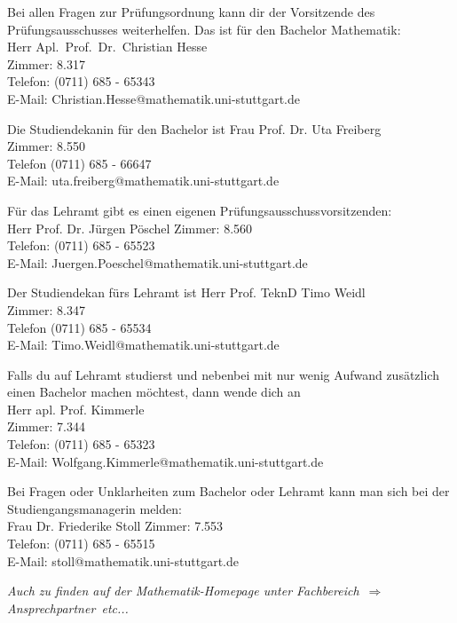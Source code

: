 Bei allen Fragen zur Prüfungsordnung
kann dir der Vorsitzende des Prüfungsausschusses weiterhelfen.
Das ist für den Bachelor Mathematik:\\
Herr Apl.~Prof.~Dr.~Christian Hesse\\
Zimmer: 8.317\\
Telefon: (0711) 685 - 65343\\
E-Mail: Christian.Hesse@mathematik.uni-stuttgart.de

Die Studiendekanin für den  Bachelor ist
Frau Prof. Dr. Uta Freiberg\\
Zimmer: 8.550\\
Telefon (0711) 685 - 66647\\
E-Mail:  uta.freiberg@mathematik.uni-stuttgart.de

\label{LAzust}
Für das Lehramt gibt es einen eigenen Prüfungsausschussvorsitzenden:\\
Herr Prof. Dr. Jürgen Pöschel
Zimmer:  8.560\\
Telefon: (0711) 685 - 65523\\
E-Mail: Juergen.Poeschel@mathematik.uni-stuttgart.de

Der Studiendekan fürs Lehramt ist
Herr Prof. TeknD Timo Weidl\\
Zimmer: 8.347\\
Telefon (0711) 685 - 65534\\
E-Mail: Timo.Weidl@mathematik.uni-stuttgart.de

Falls du auf Lehramt studierst
und nebenbei mit nur wenig Aufwand
zusätzlich einen Bachelor machen möchtest,
dann wende dich an\\
Herr apl. Prof. Kimmerle\\
Zimmer: 7.344\\
Telefon: (0711) 685 - 65323\\
E-Mail: Wolfgang.Kimmerle@mathematik.uni-stuttgart.de

Bei Fragen oder Unklarheiten zum Bachelor
oder Lehramt kann man sich
bei der Studiengangsmanagerin melden:\\
Frau Dr. Friederike Stoll
Zimmer:  7.553 \\
Telefon: (0711) 685 - 65515 \\
E-Mail: stoll@mathematik.uni-stuttgart.de

{\it Auch zu finden auf der Mathematik-Homepage unter \glqq Fachbereich\grqq\ 
$\Rightarrow$ \glqq Ansprechpartner\grqq\ etc...}
\\

